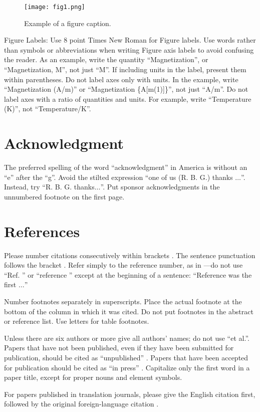 \documentclass[conference]{IEEEtran}
\begin{document}
\begin{figure}[htbp]
\centerline{\texttt{[image: fig1.png]}}
\caption{Example of a figure caption.}
\label{fig}
\end{figure}

Figure Labels: Use 8 point Times New Roman for Figure labels. Use words 
rather than symbols or abbreviations when writing Figure axis labels to 
avoid confusing the reader. As an example, write the quantity 
``Magnetization'', or ``Magnetization, M'', not just ``M''. If including 
units in the label, present them within parentheses. Do not label axes only 
with units. In the example, write ``Magnetization (A/m)'' or ``Magnetization 
\{A[m(1)]\}'', not just ``A/m''. Do not label axes with a ratio of 
quantities and units. For example, write ``Temperature (K)'', not 
``Temperature/K''.

\section*{Acknowledgment}

The preferred spelling of the word ``acknowledgment'' in America is without 
an ``e'' after the ``g''. Avoid the stilted expression ``one of us (R. B. 
G.) thanks $\ldots$''. Instead, try ``R. B. G. thanks$\ldots$''. Put sponsor 
acknowledgments in the unnumbered footnote on the first page.

\section*{References}

Please number citations consecutively within brackets \cite{b1}. The 
sentence punctuation follows the bracket \cite{b2}. Refer simply to the reference 
number, as in \cite{b3}---do not use ``Ref. \cite{b3}'' or ``reference \cite{b3}'' except at 
the beginning of a sentence: ``Reference \cite{b3} was the first $\ldots$''

Number footnotes separately in superscripts. Place the actual footnote at 
the bottom of the column in which it was cited. Do not put footnotes in the 
abstract or reference list. Use letters for table footnotes.

Unless there are six authors or more give all authors' names; do not use 
``et al.''. Papers that have not been published, even if they have been 
submitted for publication, should be cited as ``unpublished'' \cite{b4}. Papers 
that have been accepted for publication should be cited as ``in press'' \cite{b5}. 
Capitalize only the first word in a paper title, except for proper nouns and 
element symbols.

For papers published in translation journals, please give the English 
citation first, followed by the original foreign-language citation \cite{b6}.




\vspace{12pt}
\end{document}
